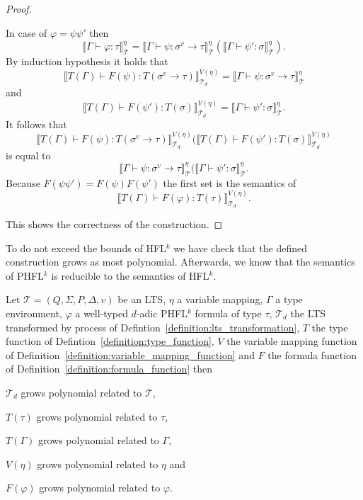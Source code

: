 \begin{proof}
\begin{compactitem}
        \item In case of $\varphi = \psi\psi'$ then
        \[\llbracket \Gamma \vdash \varphi \colon \tau \rrbracket^\eta_\mathcal{T} = \llbracket \Gamma \vdash \psi
        \colon \sigma^v \rightarrow \tau \rrbracket^\eta_\mathcal{T}(\llbracket \Gamma \vdash \psi' \colon
        \sigma \rrbracket^\eta_\mathcal{T}).\]
        By induction hypothesis it holds that \[\llbracket T(\Gamma) \vdash F(\psi) \colon T
        (\sigma^v \rightarrow \tau) \rrbracket^{V(\eta)}_{\mathcal{T}_d} = \llbracket \Gamma
        \vdash \psi \colon \sigma^v \rightarrow \tau \rrbracket^\eta_\mathcal{T}\]
        and
        \[\llbracket T(\Gamma) \vdash F(\psi') \colon T
        (\sigma) \rrbracket^{V(\eta)}_{\mathcal{T}_d} = \llbracket \Gamma
        \vdash \psi' \colon \sigma \rrbracket^\eta_\mathcal{T}.\]
        It follows that
        \[\llbracket T(\Gamma) \vdash F(\psi) \colon T
        (\sigma^v \rightarrow \tau) \rrbracket^{V(\eta)}_{\mathcal{T}_d}(\llbracket T(\Gamma) \vdash F(\psi') \colon T
        (\sigma) \rrbracket^{V(\eta)}_{\mathcal{T}_d}\]
        is equal to
        \[\llbracket \Gamma \vdash \psi
        \colon \sigma^v \rightarrow \tau \rrbracket^\eta_\mathcal{T}(\llbracket \Gamma \vdash \psi' \colon \sigma
        \rrbracket^\eta_\mathcal{T}.\]
        Because $F(\psi\psi') = F(\psi)F(\psi')$ the first set is the semantics of
        \[\llbracket T(\Gamma) \vdash F(\varphi) \colon T(\tau) \rrbracket^{V(\eta)}_{\mathcal{T}_d}.\]
    \end{compactitem}
    This shows the correctness of the construction. 
\end{proof}

To do not exceed the bounds of HFL$^k$ we have check that the defined construction grows as most polynomial.  Afterwards, we know that the semantics of PHFL$^k$ is
reducible to the semantics of HFL$^k$.

\begin{lemma}
\label{lemma:phfl_to_hfl_polynomial}
Let $\mathcal{T} = (Q, \Sigma, P, \Delta, v)$ be an LTS, $\eta$ a variable mapping, $\Gamma$ a type environment, $\varphi$ a well-typed $d$-adic
    PHFL$^k$ formula of type $\tau$, $\mathcal{T}_d$ the LTS transformed by process of
    Defintion~\ref{definition:lts_transformation}, $T$ the type function of Defintion~\ref{definition:type_function},
    $V$ the variable mapping function of Definition~\ref{definition:variable_mapping_function}
    and $F$ the formula function of Definition~\ref{definition:formula_function} then 
    \begin{compactitem}
    \item $\mathcal{T}_d$ grows polynomial related to $\mathcal{T}$, 
    \item $T(\tau)$ grows polynomial related to $\tau$,
    \item $T(\Gamma)$ grows polynomial related to $\Gamma$,
    \item $V(\eta)$ grows polynomial related to $\eta$ and
    \item $F(\varphi)$ grows polynomial related to $\varphi$.
    \end{compactitem}
\end{lemma}

